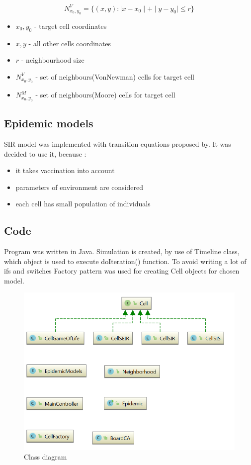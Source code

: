 \documentclass[a4paper, 11pt]{article}
\begin{document}
\begin{equation}
	N^{V}_{x_0,y_0}=\{ \left(x,y\right): \mid x-x_0 \mid + \mid y-y_0 \mid \leq r   \} 
\end{equation}

\begin{itemize}
	\item $x_0,y_0$ - target cell coordinates
	\item $x,y$ - all other cells coordinates
	\item $r$ - neighbourhood size	
	\item $N^{V}_{x_0,y_0}$ - set of neighbours(VonNewman) cells for target cell
	\item $N^{M}_{x_0,y_0}$ - set of neighbours(Moore) cells for target cell
\end{itemize}

\subsection{Epidemic models}

SIR model was implemented with transition equations proposed by\cite{WHITE}. It was decided to use it, because :\\
\begin{itemize}
\item it takes vaccination into account
\item parameters of environment are considered
\item each cell has small population of individuals
\end{itemize}



\subsection{Code}
Program was written in Java. Simulation is created, by use of Timeline class, which object is used to execute doIteration() function. To avoid writing a lot of ifs and switches Factory pattern was used for creating Cell objects for chosen model.
\begin{figure}[H]
\includegraphics[scale=0.7]{klasy.PNG} 
\caption{Class diagram}
\end{figure}

\end{document}
